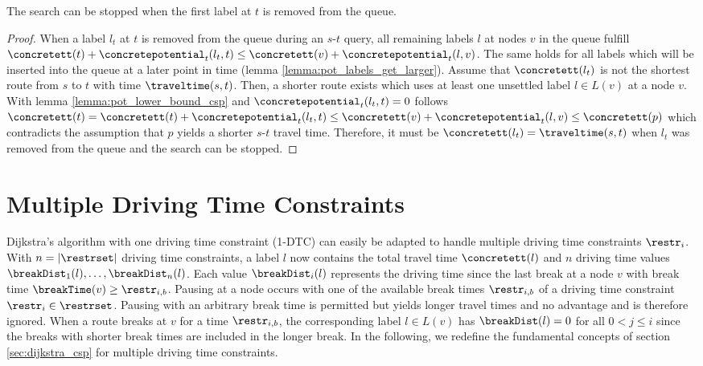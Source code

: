\begin{theorem}\label{theorem:pot_stop_criterion}
	The search can be stopped when the first label at $t$ is removed from the queue.
\end{theorem}

\begin{proof}
	When a label $l_t$ at $t$ is removed from the queue during an $s$-$t$ query, all remaining labels $l$ at nodes $v$ in the queue fulfill $\concretett(t) + \concretepotential_t(l_t,t) \le \concretett(v) + \concretepotential_t(l,v)$. The same holds for all labels which will be inserted into the queue at a later point in time (lemma \ref{lemma:pot_labels_get_larger}). Assume that $\concretett(l_t)$ is not the shortest route from $s$ to $t$ with time $\traveltime(s,t)$. Then, a shorter route exists which uses at least one unsettled label $l \in L(v)$ at a node $v$. With lemma \ref{lemma:pot_lower_bound_csp} and $\concretepotential_t(l_t,t) = 0$ follows $\concretett(t) = \concretett(t) + \concretepotential_t(l_t,t) \le \concretett(v) + \concretepotential_t(l,v) \le \concretett(p)$ which contradicts the assumption that $p$ yields a shorter $s$-$t$ travel time. Therefore, it must be $\concretett(l_t) = \traveltime(s,t)$ when $l_t$ was removed from the queue and the search can be stopped.
\end{proof}

\section{Multiple Driving Time Constraints\label{section:n_csp}}
Dijkstra's algorithm with one driving time constraint (1-DTC) can easily be adapted to handle multiple driving time constraints $\restr_i$. With $n=|\restrset|$ driving time constraints, a label $l$ now contains the total travel time $\concretett(l)$ and $n$ driving time values $\breakDist_1(l), \ldots , \breakDist_n(l)$. Each value $\breakDist_i(l)$ represents the driving time since the last break at a node $v$ with break time $\breakTime(v) \ge \restr_{i,b}$. Pausing at a node occurs with one of the available break times $\restr_{i,b}$ of a driving time constraint $\restr_i \in \restrset$. Pausing with an arbitrary break time is permitted but yields longer travel times and no advantage and is therefore ignored. When a route breaks at $v$ for a time $\restr_{i,b}$, the corresponding label $l \in L(v)$ has $\breakDist(l) = 0$ for all $0 < j \le i$ since the breaks with shorter break times are included in the longer break. In the following, we redefine the fundamental concepts of section \ref{sec:dijkstra_csp} for multiple driving time constraints.

